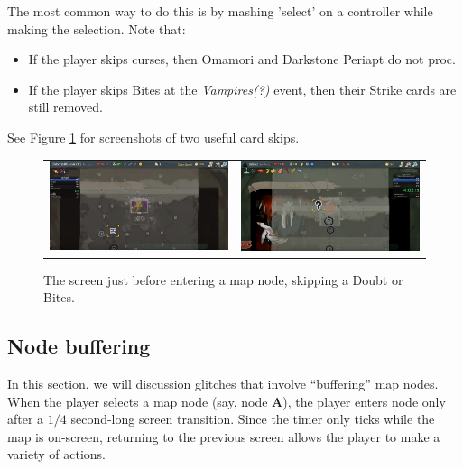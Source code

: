\documentclass[12pt]{amsart}
\begin{document}
The most common way to do this is by mashing 'select' on a controller while making the selection.  
Note that: 
\begin{itemize}
    \item 
        If the player skips curses, then  Omamori and Darkstone Periapt do not proc.  
    \item 
        If the player skips Bites at the \textit{Vampires(?)} event, then their Strike cards are still removed.  
\end{itemize}
See Figure \ref{fig: card skips} for screenshots of two useful card skips.  
\begin{figure}[h]
    \centering
    \begin{tabular}{c|c}
        \includegraphics[scale=.3]{graphics/CurseSkip.png}
        & \includegraphics[scale=.3]{graphics/BitesSkip.png}
    \end{tabular}
    \caption{The screen just before entering a map node, skipping a Doubt or Bites.  }
    \label{fig: card skips}
\end{figure}
\subsection{Node buffering}\label{sub-sec: node buffering}
In this section, we will discussion glitches that involve ``buffering'' map nodes.  
When the player selects a map node (say, node \textbf{A}), the player enters node  only after a $1/4$ second-long screen transition.  
Since the timer only ticks while the map is on-screen, returning to the previous screen allows the player to make a variety of actions.  
\\
\end{document}
